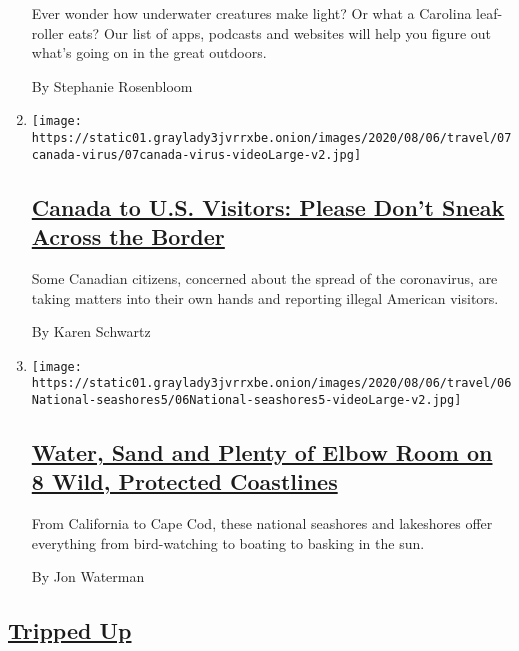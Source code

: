 \begin{enumerate}
  Ever wonder how underwater creatures make light? Or what a Carolina
  leaf-roller eats? Our list of apps, podcasts and websites will help
  you figure out what's going on in the great outdoors.

  By Stephanie Rosenbloom
\item
  \texttt{[image: https://static01.graylady3jvrrxbe.onion/images/2020/08/06/travel/07canada-virus/07canada-virus-videoLarge-v2.jpg]}

  \hypertarget{canada-to-us-visitors-please-dont-sneak-across-the-border}{%
  \subsection{\texorpdfstring{\href{/2020/08/07/travel/Canada-border-crossings-coronavirus.html}{Canada
  to U.S. Visitors: Please Don't Sneak Across the
  Border}}{Canada to U.S. Visitors: Please Don't Sneak Across the Border}}\label{canada-to-us-visitors-please-dont-sneak-across-the-border}}

  Some Canadian citizens, concerned about the spread of the coronavirus,
  are taking matters into their own hands and reporting illegal American
  visitors.

  By Karen Schwartz
\item
  \texttt{[image: https://static01.graylady3jvrrxbe.onion/images/2020/08/06/travel/06National-seashores5/06National-seashores5-videoLarge-v2.jpg]}

  \hypertarget{water-sand-and-plenty-of-elbow-room-on-8-wild-protected-coastlines}{%
  \subsection{\texorpdfstring{\href{/2020/08/06/travel/National-Seashores.html}{Water,
  Sand and Plenty of Elbow Room on 8 Wild, Protected
  Coastlines}}{Water, Sand and Plenty of Elbow Room on 8 Wild, Protected Coastlines}}\label{water-sand-and-plenty-of-elbow-room-on-8-wild-protected-coastlines}}

  From California to Cape Cod, these national seashores and lakeshores
  offer everything from bird-watching to boating to basking in the sun.

  By Jon Waterman
\end{enumerate}

\hypertarget{tripped-up}{%
\subsection{\texorpdfstring{\href{/column/tripped-up}{Tripped
Up}}{Tripped Up}}\label{tripped-up}}

